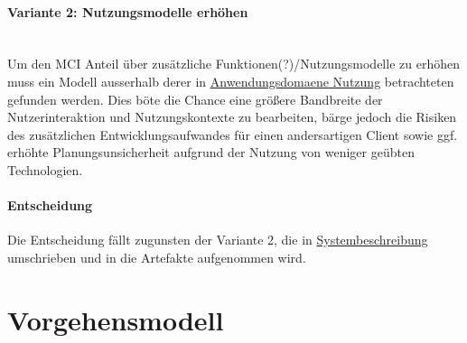%
\paragraph*{Variante 2: Nutzungsmodelle erhöhen}\\
Um den MCI Anteil über zusätzliche Funktionen(?)/Nutzungsmodelle zu erhöhen muss ein Modell ausserhalb derer in \href{}{Anwendungsdomaene Nutzung} betrachteten gefunden werden. Dies böte die Chance eine größere Bandbreite der Nutzerinteraktion und 
Nutzungskontexte zu bearbeiten, bärge jedoch die Risiken des zusätzlichen Entwicklungsaufwandes für einen andersartigen Client
sowie ggf. erhöhte Planungsunsicherheit aufgrund der Nutzung von weniger geübten Technologien.

%
\paragraph*{Entscheidung}
Die Entscheidung fällt zugunsten der Variante 2, die in \href{sec:systembeschreibung_steuerungsclient}{Systembeschreibung} umschrieben
und in die Artefakte aufgenommen wird.


\section{Vorgehensmodell}


